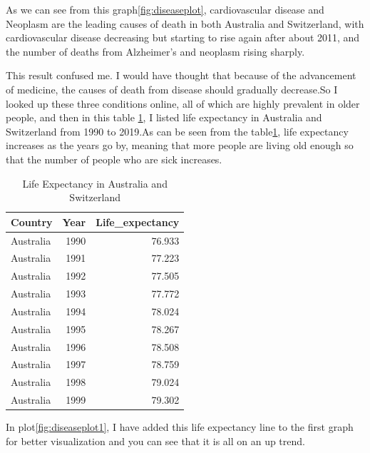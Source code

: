 \documentclass[11pt,a4paper,]{article}
\begin{document}
As we can see from this graph\ref{fig:diseaseplot}, cardiovascular disease and Neoplasm are the leading causes of death in both Australia and Switzerland, with cardiovascular disease decreasing but starting to rise again after about 2011, and the number of deaths from Alzheimer's and neoplasm rising sharply.

This result confused me. I would have thought that because of the advancement of medicine, the causes of death from disease should gradually decrease.So I looked up these three conditions online, all of which are highly prevalent in older people, and then in this table \ref{tab:lifeexpendcy}, I listed life expectancy in Australia and Switzerland from 1990 to 2019.As can be seen from the table\ref{tab:lifeexpendcy}, life expectancy increases as the years go by, meaning that more people are living old enough so that the number of people who are sick increases.

\begin{table}

\caption{\label{tab:lifeexpendcy}Life Expectancy in Australia and Switzerland}
\centering
\begin{tabular}[t]{l|r|r}
\hline
Country & Year & Life\_expectancy\\
\hline
Australia & 1990 & 76.933\\
\hline
Australia & 1991 & 77.223\\
\hline
Australia & 1992 & 77.505\\
\hline
Australia & 1993 & 77.772\\
\hline
Australia & 1994 & 78.024\\
\hline
Australia & 1995 & 78.267\\
\hline
Australia & 1996 & 78.508\\
\hline
Australia & 1997 & 78.759\\
\hline
Australia & 1998 & 79.024\\
\hline
Australia & 1999 & 79.302\\
\hline
\end{tabular}
\end{table}

In plot\ref{fig:diseaseplot1}, I have added this life expectancy line to the first graph for better visualization and you can see that it is all on an up trend.
\end{document}
